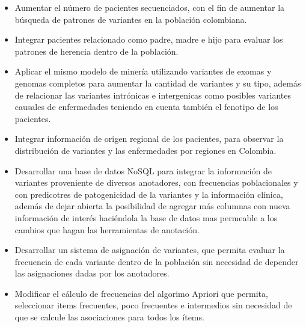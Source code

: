 \begin{itemize}
	\item Aumentar el número de pacientes secuenciados, con el fin de aumentar la búsqueda de patrones de variantes en la población colombiana.
	
	\item Integrar pacientes relacionado como padre, madre e hijo para evaluar los patrones de herencia dentro de la población.
	
	\item Aplicar el mismo modelo de minería utilizando variantes de exomas  y genomas completos para aumentar la cantidad de variantes y su tipo, además de relacionar las variantes intrónicas e intergenicas como posibles variantes causales de enfermedades teniendo en cuenta también el fenotipo de los pacientes.
	
	\item Integrar información de origen regional de los pacientes, para observar la distribución de variantes y las enfermedades por regiones en Colombia.
	
	\item Desarrollar una base de datos NoSQL para integrar la información de variantes proveniente de diversos anotadores, con frecuencias poblacionales y con predicotres de patogenicidad de la variantes y la información clínica, además de dejar abierta la posibilidad de agregar más columnas con nueva información de interés haciéndola la base de datos mas permeable a los cambios que hagan las herramientas de anotación. 
	
	\item Desarrollar un sistema de asignación de variantes, que permita evaluar la frecuencia de cada variante dentro de la población sin necesidad de depender las asignaciones dadas por los anotadores.
	
	\item Modificar el cálculo de frecuencias del algorimo Apriori que permita, seleccionar items frecuentes, poco frecuentes e intermedios sin necesidad de que se calcule las asociaciones para todos los ítems. 

\end{itemize}
